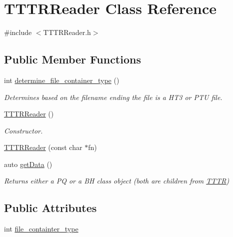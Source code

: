 \hypertarget{class_t_t_t_r_reader}{}\section{T\+T\+T\+R\+Reader Class Reference}
\label{class_t_t_t_r_reader}


{\ttfamily \#include $<$T\+T\+T\+R\+Reader.\+h$>$}

\subsection*{Public Member Functions}
\begin{DoxyCompactItemize}
\item 
int \hyperlink{class_t_t_t_r_reader_af64354acc2b4f3890a1b67e7eca1b433}{determine\+\_\+file\+\_\+container\+\_\+type} ()
\begin{DoxyCompactList}\small\item\em Determines based on the filename ending the file is a H\+T3 or P\+TU file. \end{DoxyCompactList}\item 
\hyperlink{class_t_t_t_r_reader_ab749ea989cd55fcf2e05857c3c661257}{T\+T\+T\+R\+Reader} ()
\begin{DoxyCompactList}\small\item\em Constructor. \end{DoxyCompactList}\item 
\hyperlink{class_t_t_t_r_reader_a23293773504805d8ee25d60f6395106a}{T\+T\+T\+R\+Reader} (const char $\ast$fn)
\item 
auto \hyperlink{class_t_t_t_r_reader_ac869d47bb5af35a9000b679e20ec6517}{get\+Data} ()
\begin{DoxyCompactList}\small\item\em Returns either a PQ or a BH class object (both are children from \hyperlink{class_t_t_t_r}{T\+T\+TR}) \end{DoxyCompactList}\end{DoxyCompactItemize}
\subsection*{Public Attributes}
\begin{DoxyCompactItemize}
\item 
int \hyperlink{class_t_t_t_r_reader_a9c58af8a40c6ed1608652624b5d60780}{file\+\_\+containter\+\_\+type}
\end{DoxyCompactItemize}


